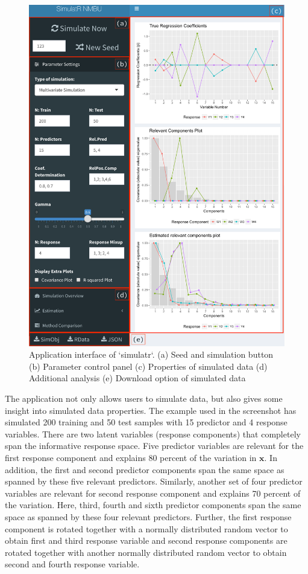 \documentclass[3p,times,12pt,authoryear]{elsarticle}
\theoremstyle{definition}
\theoremstyle{definition}
\theoremstyle{remark}
\begin{document}
\begin{figure}[!htb]

{\centering \includegraphics[width=0.95\linewidth]{images/AppSimulatr} 

}

\caption{Application interface of `simulatr`. (a) Seed and simulation button (b) Parameter control panel (c) Properties of simulated data (d) Additional analysis (e) Download option of simulated data}\label{fig:AppSimulatr}
\end{figure}

The application not only allows users to simulate data, but also gives
some insight into simulated data properties. The example used in the
screenshot has simulated 200 training and 50 test samples with 15
predictor and 4 response variables. There are two latent variables
(response components) that completely span the informative response
space. Five predictor variables are relevant for the first response
component and explains 80 percent of the variation in \(\mathbf{x}\). In
addition, the first and second predictor components span the same space
as spanned by these five relevant predictors. Similarly, another set of
four predictor variables are relevant for second response component and
explains 70 percent of the variation. Here, third, fourth and sixth
predictor components span the same space as spanned by these four
relevant predictors. Further, the first response component is rotated
together with a normally distributed random vector to obtain first and
third response variable and second response components are rotated
together with another normally distributed random vector to obtain
second and fourth response variable.
\end{document}
